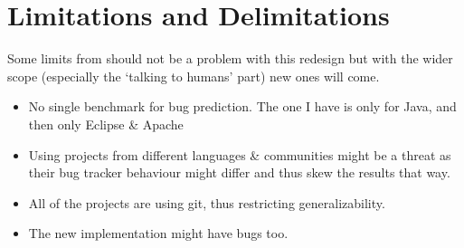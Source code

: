 \section{Limitations and Delimitations}

Some limits from \cite{scholz2016line} should not be a problem with this redesign but with the wider scope (especially the `talking to humans' part) new ones will come. 

\begin{itemize}
    \item No single benchmark for bug prediction. The one I have is only for Java, and then only Eclipse \& Apache
    \item Using projects from different languages \& communities might be a threat as their bug tracker behaviour might differ and thus skew the results that way. %
    \item All of the projects are using git, thus restricting generalizability. %
    
    \item The new implementation might have bugs too.
\end{itemize}



